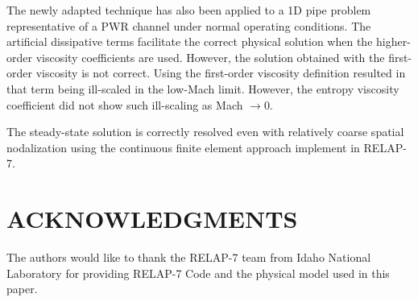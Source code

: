 \documentclass[12pt]{article}
\begin{document}
The newly adapted technique has also been applied to a 1D pipe problem representative of a PWR channel under normal operating conditions. The artificial dissipative terms facilitate the correct physical solution when the higher-order viscosity coefficients are used. However, the solution obtained with the first-order viscosity is not correct.
Using the first-order viscosity definition resulted in that term being ill-scaled in the low-Mach limit. However, the entropy viscosity coefficient did not show such ill-scaling as Mach $\rightarrow 0$.

The steady-state solution is correctly resolved even with relatively coarse spatial nodalization using the continuous finite element approach implement in RELAP-7.

%
\section*{ACKNOWLEDGMENTS}

The authors would like to thank the RELAP-7 team from Idaho National Laboratory for providing RELAP-7 Code and the physical model used in this paper.

%
%
%
%
%
\end{document}

